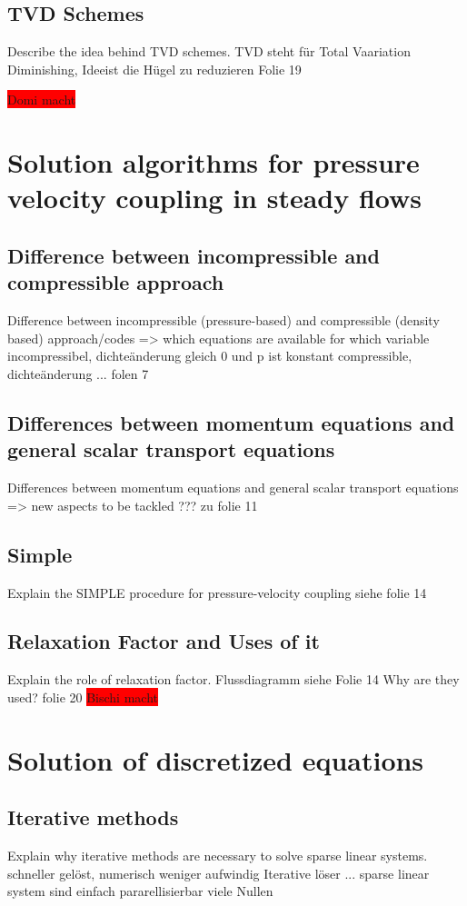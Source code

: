 \documentclass[a4paper]{scrartcl}
\begin{document}
\subsection{TVD Schemes} Describe the idea behind TVD schemes.
TVD steht für Total Vaariation Diminishing,
Ideeist die Hügel zu reduzieren
Folie 19


\colorbox{red}{Domi macht}


\section{Solution algorithms for pressure velocity coupling in steady flows}
\subsection{Difference between incompressible and compressible approach}
Difference between incompressible (pressure-based) and compressible (density based) approach/codes => which equations are available for which variable
incompressibel, dichteänderung gleich 0 und p ist konstant
compressible, dichteänderung ...
folen 7


\subsection{Differences between momentum equations and general scalar transport
equations} 
Differences between momentum equations and general scalar transport
equations => new aspects to be tackled ??? zu folie 11

\subsection{Simple} Explain the SIMPLE procedure for pressure-velocity coupling
siehe folie 14

\subsection{Relaxation Factor and Uses of it}
Explain the role of relaxation factor. 
Flussdiagramm siehe Folie 14
 Why are they used?
folie 20
\colorbox{red}{Bischi macht}


\section{Solution of discretized equations}


\subsection{Iterative methods} 
Explain why iterative methods are necessary to
solve sparse linear systems.
schneller gelöst, numerisch weniger aufwindig
Iterative löser ...
sparse linear system sind einfach pararellisierbar viele Nullen
\end{document}
